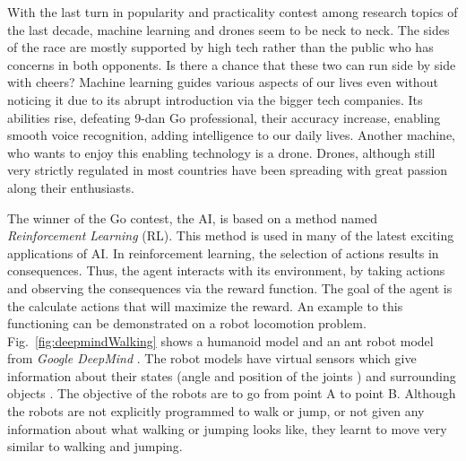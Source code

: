 With the last turn in popularity and practicality contest among research topics of the last decade, machine learning and drones seem to be neck to neck. The sides of the race are mostly supported by high tech rather than the public who has concerns in both opponents. Is there a chance that these two can run side by side with cheers? Machine learning guides various aspects of our lives even without noticing it due to its abrupt introduction via the bigger tech companies. Its abilities rise, defeating 9-dan Go professional, their accuracy increase, enabling smooth voice recognition, adding intelligence to our daily lives. Another machine, who wants to enjoy this enabling technology is a drone. Drones, although still very strictly regulated in most countries have been spreading with great passion along their enthusiasts. 
\fi

The winner of the Go contest, the AI, is based on a method named \emph{Reinforcement Learning} (RL). This method is used in many of the latest exciting applications of AI. In reinforcement learning, the selection of actions results in consequences. Thus, the agent interacts with its environment, by taking actions and observing the consequences via the reward function. The goal of the agent is the calculate actions that will maximize the reward. An example to this functioning can be demonstrated on a robot locomotion problem. Fig.~\ref{fig:deepmindWalking} shows a humanoid model and an ant robot model from \emph{Google DeepMind} \cite{deepmindWebsiteHumonoidWalking,deepmindHumonoidWalkingStanford,deepmindHumonoidWalkingVideo}. The robot models have virtual sensors which give information about their states (angle and position of the joints \cite{deepmindHumonoidWalkingStanford}) and surrounding objects \cite{deepmindHumonoidWalkingVideo}. The objective of the robots are to go from point A to point B. Although the robots are not explicitly programmed to walk or jump, or not given any information about what walking or jumping looks like, they learnt to move very similar to walking and jumping.


